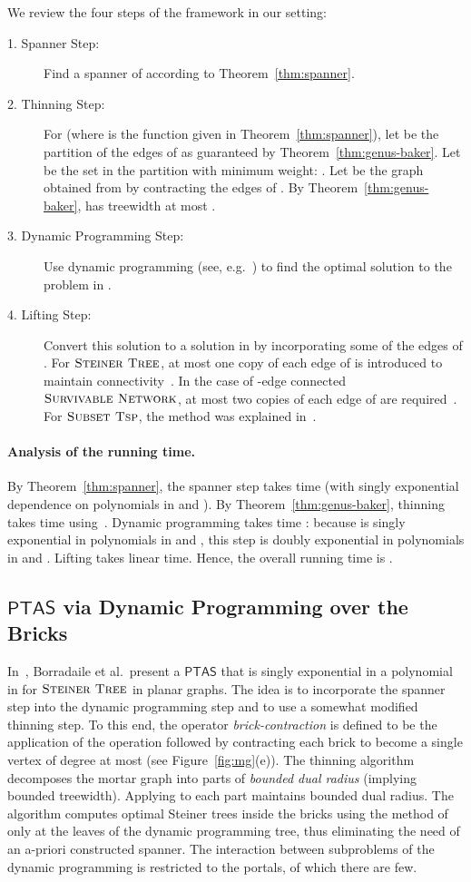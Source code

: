 \documentclass{article}
\newcommand{\CompClass}[1]{\ensuremath{\mathsf{#1}}\xspace}
\newcommand{\PTAS}{\CompClass{PTAS}}
\newcommand{\myproblemname}[1]{\ensuremath{\mbox{\sc #1}}\xspace}
\newcommand{\steiner}{\myproblemname{Steiner Tree}}
\newcommand{\subtsp}{\myproblemname{Subset Tsp}}
\newcommand{\survive}{\myproblemname{Survivable Network}}
\begin{document}
We review the four steps of the framework in our setting:
\begin{description}
\item[1. Spanner Step:] Find a spanner  of  according to
  Theorem~\ref{thm:spanner}.
\item[2. Thinning Step:] For  (where
   is the function given in Theorem~\ref{thm:spanner}),
  let  be the partition of the edges of  as
  guaranteed by Theorem~\ref{thm:genus-baker}.  Let  be the set
  in the partition with minimum weight: .  Let  be the graph obtained from  by contracting the
  edges of .  By Theorem~\ref{thm:genus-baker},  has
  treewidth at most .
\item[3. Dynamic Programming Step:] Use dynamic programming (see,
  e.g.~\cite{KorachSolel90}) to find the optimal solution to the
  problem in .
\item[4. Lifting Step:] Convert this solution to a solution in  by
  incorporating some of the edges of .  For \steiner, at most one
  copy of each edge of  is introduced to maintain
  connectivity~\cite{BorradaileKM09}. In the case of -edge connected
  \survive, at most two copies of each edge of  are
  required~\cite{BorradaileKlein08}. For \subtsp, the method was
  explained in~\cite{Klein06}.
\end{description}

\paragraph{Analysis of the running time.}
By Theorem~\ref{thm:spanner}, the spanner step takes
 time (with singly exponential dependence
on polynomials in  and ).  By
Theorem~\ref{thm:genus-baker}, thinning takes time  using~\cite{CabelloChambers07}. Dynamic programming takes time
: because  is
singly exponential in polynomials in  and , this
step is doubly exponential in polynomials in  and .
Lifting takes linear time.  Hence, the overall running time is
.

\subsection{\PTAS via Dynamic Programming over the Bricks} \label{sec:dp}

In~\cite{BorradaileKM09}, Borradaile et al.\ present a \PTAS that is
singly exponential in a polynomial in  for \steiner in
planar graphs. The idea is to incorporate the spanner step into the
dynamic programming step and to use a somewhat modified thinning
step. To this end, the operator \emph{brick-contraction}  is
defined to be the application of the operation  followed by
contracting each brick to become a single vertex of degree at most
 (see Figure~\ref{fig:mg}(e)). The thinning algorithm
decomposes the mortar graph  into parts  of
\emph{bounded dual radius} (implying bounded treewidth). Applying
 to each part maintains bounded dual radius. The algorithm computes
optimal Steiner trees inside the bricks using the method
of~\cite{EricksonMV87} only at the leaves of the dynamic programming tree, thus
eliminating the need of an a-priori constructed spanner. The
interaction between subproblems of the dynamic programming is
restricted to the portals, of which there are few.
\end{document}
